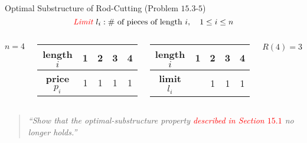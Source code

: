 
\begin{frame}{}
  \centerline{\LARGE {}}

  \vspace{0.50cm}
  \begin{columns}
  \end{columns}
\end{frame}

\begin{frame}{}
  \begin{exampleblock}{Optimal Substructure of Rod-Cutting (Problem $15.3$-$5$)}
    \[
      \text{\textcolor{red}{\it Limit }} l_i: \# \text{ of pieces of length } i, \quad 1 \le i \le n
    \]
  \end{exampleblock}

  \vspace{0.30cm}
  \begin{columns}
    \pause
      \[
	n = 4
      \]

      \begin{table}[]
	\centering
	\begin{tabular}{c||C|C|C|C}
	  \textbf{length $i$}  & 1 & 2 & 3 & 4 \\ \hline
	  \textbf{price $p_i$} & 1 & 1 & 1 & 1 
	\end{tabular}%
      \end{table}

      \begin{table}[]
	\centering
	\begin{tabular}{c||C|C|C|C}
	  \textbf{length $i$}  & 1 & 2 & 3 & 4 \\ \hline
	  \textbf{limit $l_i$} &  & 1 & 1 & 1 
	\end{tabular}%
      \end{table}
    \pause
      \[
	R(4) = 3
      \]

      \pause
  \end{columns}
\end{frame}

\begin{frame}{}

  \pause
  \begin{quote}
    {\large \it ``Show that the optimal-substructure property \textcolor<3->{red}{described in Section $15.1$} no longer holds.''}
  \end{quote}
\end{frame}

